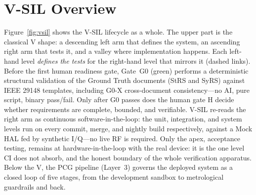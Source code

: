 \documentclass[11pt,a4paper]{article}
\begin{document}
\section{V-SIL Overview}
\label{sec:overview}

Figure~\ref{fig:vsil} shows the V-SIL lifecycle as a whole. The upper part is the classical V shape:
a descending left arm that defines the system, an ascending right arm that tests it, and a
valley where implementation happens. Each left-hand level \emph{defines the tests} for the
right-hand level that mirrors it (dashed links). Before the first human readiness gate, Gate~G0
(green) performs a deterministic structural validation of the Ground Truth documents (StRS and
SyRS) against IEEE 29148 templates, including G0-X cross-document consistency---no AI, pure
script, binary pass/fail. Only after G0 passes
does the human gate H decide whether requirements are complete, bounded, and verifiable.
V-SIL re-reads the right arm as continuous
software-in-the-loop: the unit, integration, and system levels run on every commit, merge, and
nightly build respectively, against a Mock HAL fed by synthetic I/Q---no live RF is required.
Only the apex, acceptance testing, remains at hardware-in-the-loop with the real device: it is
the one level CI does not absorb, and the honest boundary of the whole verification apparatus.
Below the V, the PCG pipeline (Layer~3) governs the deployed system as a closed loop of five
stages, from the development sandbox to metrological guardrails and back.
\end{document}
